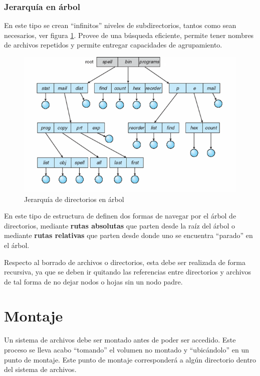 \subsubsection{Jerarquía en árbol}
En este tipo se crean ``infinitos'' niveles de subdirectorios, tantos como sean
necesarios, ver figura \ref{fig:jerarquia_arbol}. Provee de una búsqueda
eficiente, permite tener nombres de archivos repetidos y permite entregar
capacidades de agrupamiento.

\begin{figure}[htbp]
\centering
\includegraphics[scale=0.8]{img/C08_disco/jerarquia_arbol.png}
\caption{Jerarquía de directorios en árbol}
\label{fig:jerarquia_arbol}
\end{figure}

En este tipo de estructura de definen dos formas de navegar por el árbol de
directorios, mediante \textbf{rutas absolutas} que parten desde la raíz del
árbol o mediante \textbf{rutas relativas} que parten desde donde uno se
encuentra ``parado'' en el árbol.

Respecto al borrado de archivos o directorios, esta debe ser realizada de forma
recursiva, ya que se deben ir quitando las referencias entre directorios y
archivos de tal forma de no dejar nodos o hojas sin un nodo padre.

\section{Montaje}
Un sistema de archivos debe ser montado antes de poder ser accedido. Este
proceso se lleva acabo ``tomando'' el volumen no montado y ``ubicándolo'' en un
punto de montaje. Este punto de montaje corresponderá a algún directorio dentro
del sistema de archivos.

